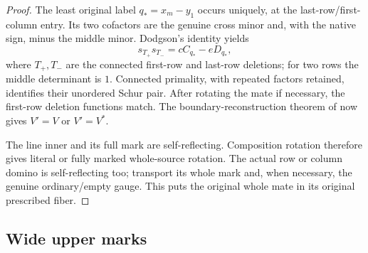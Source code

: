\documentclass[11pt,a4paper]{amsart}
\numberwithin{equation}{section}
\theoremstyle{plain}
\theoremstyle{definition}
\begin{document}
\begin{proof}
The least original label \(q_*=x_m-y_1\) occurs uniquely, at the
last-row/first-column entry.  Its two cofactors are the genuine cross
minor and, with the native sign, minus the middle minor.  Dodgson's
identity yields
\begin{equation}\label{rt:tail-product}
 s_{T_+}s_{T_-}=cC_{q_*}-eD_{q_*},
\end{equation}
where \(T_+,T_-\) are the connected first-row and last-row deletions;
for two rows the middle determinant is \(1\).  Connected primality,
with repeated factors retained, identifies their unordered Schur pair.
After rotating the mate if necessary, the first-row deletion functions
match.  The boundary-reconstruction theorem of
\cite[Reconstruction from two boundary observations]{Shields2026SkewSchur}
now gives \(V'=V\) or \(V'=V^*\).

The line inner and its full mark are self-reflecting.  Composition
rotation therefore gives literal or fully marked whole-source rotation.
The actual row or column domino is self-reflecting too; transport its
whole mark and, when necessary, the genuine ordinary/empty gauge.
This puts the original whole mate in its original prescribed fiber.
\end{proof}

\subsection{Wide upper marks}
\end{document}
